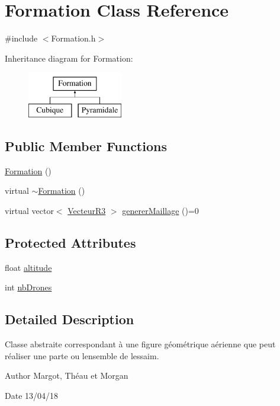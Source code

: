 \hypertarget{class_formation}{}\section{Formation Class Reference}
\label{class_formation}


{\ttfamily \#include $<$Formation.\+h$>$}

Inheritance diagram for Formation\+:\begin{figure}[H]
\begin{center}
\leavevmode
\includegraphics[height=2.000000cm]{class_formation}
\end{center}
\end{figure}
\subsection*{Public Member Functions}
\begin{DoxyCompactItemize}
\item 
\mbox{\hyperlink{class_formation_a60c3058dd353550d89183ec529909cb6}{Formation}} ()
\item 
virtual \mbox{\hyperlink{class_formation_a5b4ffd37549ec211d85e52c916f35eb6}{$\sim$\+Formation}} ()
\item 
virtual vector$<$ \mbox{\hyperlink{class_vecteur_r3}{Vecteur\+R3}} $>$ \mbox{\hyperlink{class_formation_ad1044228c0a1a4ee585ffe7f615c06ea}{generer\+Maillage}} ()=0
\end{DoxyCompactItemize}
\subsection*{Protected Attributes}
\begin{DoxyCompactItemize}
\item 
float \mbox{\hyperlink{class_formation_a46ac97ac7c664d265c91a9ba3c718282}{altitude}}
\item 
int \mbox{\hyperlink{class_formation_a946670f42a19f84960990e9ffb781877}{nb\+Drones}}
\end{DoxyCompactItemize}


\subsection{Detailed Description}
Classe abstraite correspondant à une figure géométrique aérienne que peut réaliser une parte ou l\textquotesingle{}ensemble de l\textquotesingle{}essaim. \begin{DoxyAuthor}{Author}
Margot, Théau et Morgan 
\end{DoxyAuthor}
\begin{DoxyDate}{Date}
13/04/18 
\end{DoxyDate}


